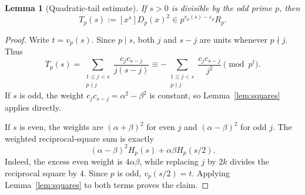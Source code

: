 \documentclass[11pt,a4paper]{article}
\numberwithin{equation}{section}
\newtheorem{lemma}[theorem]{Lemma}
\theoremstyle{definition}
\theoremstyle{remark}
\newcommand{\eps}{\varepsilon}
\begin{document}
\begin{lemma}[Quadratic-tail estimate]\label{lem:quadratic}
If $s>0$ is divisible by the odd prime $p$, then
\begin{equation}\label{eq:Tvaluation}
 T_p(s):=[x^s]D_p(x)^2\in p^{v_p(s)-\eps_p}R_p.
\end{equation}
\end{lemma}
\begin{proof}
Write $t=v_p(s)$. Since $p\mid s$, both $j$ and $s-j$ are units whenever
$p\nmid j$. Thus
\[
 T_p(s)=\sum_{\substack{1\le j<s\\p\nmid j}}
 \frac{c_jc_{s-j}}{j(s-j)}
 \equiv-\sum_{\substack{1\le j<s\\p\nmid j}}
 \frac{c_jc_{s-j}}{j^2}\pmod{p^t}.
\]
If $s$ is odd, the weight $c_jc_{s-j}=\alpha^2-\beta^2$ is constant, so
Lemma~\ref{lem:squares} applies directly.

If $s$ is even, the weights are $(\alpha+\beta)^2$ for even $j$ and
$(\alpha-\beta)^2$ for odd $j$. The weighted reciprocal-square sum is
exactly
\[
 (\alpha-\beta)^2H_p(s)+\alpha\beta H_p(s/2).
\]
Indeed, the excess even weight is $4\alpha\beta$, while replacing $j$ by
$2k$ divides the reciprocal square by $4$. Since $p$ is odd,
$v_p(s/2)=t$. Applying Lemma~\ref{lem:squares} to both terms proves the
claim.
\end{proof}
\end{document}
